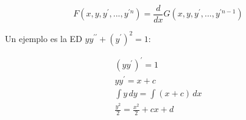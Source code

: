 \documentclass[a4paper,12pt,titlepage]{article}
\begin{document}
\begin{equation*}
    F(x,y,y^\prime,...,y^{\prime n})=\frac{d}{dx}G(x,y,y^\prime,...,y^{\prime n-1})
\end{equation*}

Un ejemplo es la ED $yy^{\prime \prime} + (y^{\prime})^2=1$:

\begin{equation*}
    \begin{gathered}
    \left (yy^\prime\right )^\prime = 1\\
    yy^\prime = x + c \\
    \int y \,dy = \int (x+c)\, dx \\
    \frac{y^2}{2} = \frac{x^2}{2} + cx + d
    \end{gathered}
\end{equation*}
\end{document}
